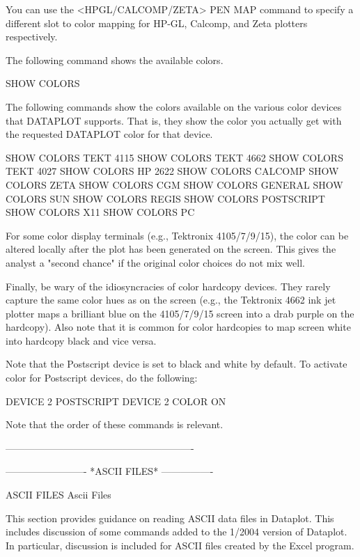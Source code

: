 You can use the <HPGL/CALCOMP/ZETA> PEN MAP command to specify a
different slot to color mapping for HP-GL, Calcomp, and Zeta plotters
respectively.
 
The following command shows the available colors.
 
         SHOW COLORS
 
The following commands show the colors available on the various color
devices that DATAPLOT supports.  That is, they show the color you
actually get with the requested DATAPLOT color for that device.
 
         SHOW COLORS TEKT 4115
         SHOW COLORS TEKT 4662
         SHOW COLORS TEKT 4027
         SHOW COLORS HP 2622
         SHOW COLORS CALCOMP
         SHOW COLORS ZETA
         SHOW COLORS CGM
         SHOW COLORS GENERAL
         SHOW COLORS SUN
         SHOW COLORS REGIS
         SHOW COLORS POSTSCRIPT
         SHOW COLORS X11
         SHOW COLORS PC
 
For some color display terminals (e.g., Tektronix 4105/7/9/15), the
color can be altered locally after the plot has been generated on the
screen.  This gives the analyst a "second chance" if the original
color choices do not mix well.
 
Finally, be wary of the idiosyncracies of color hardcopy devices.  They
rarely capture the same color hues as on the screen (e.g., the
Tektronix 4662 ink jet plotter maps a brilliant blue on the 4105/7/9/15
screen into a drab purple on the hardcopy).  Also note that it is
common for color hardcopies to map screen white into hardcopy black
and vice versa.

Note that the Postscript device is set to black and white by
default.  To activate color for Postscript devices, do the
following:

     DEVICE 2 POSTSCRIPT
     DEVICE 2 COLOR ON

Note that the order of these commands is relevant.

----------------------------------------------------------







-------------------------  *ASCII FILES*  ----------------
 
ASCII FILES
Ascii Files
 
This section provides guidance on reading ASCII data files in
Dataplot.  This includes discussion of some commands added to
the 1/2004 version of Dataplot.  In particular, discussion is
included for ASCII files created by the Excel program.

